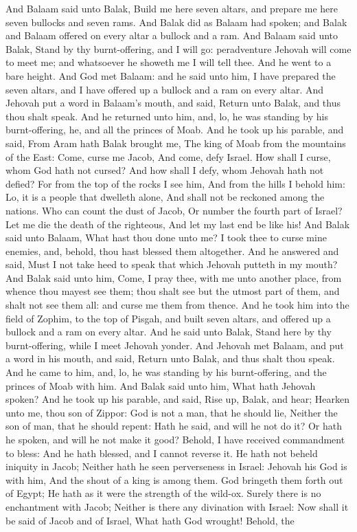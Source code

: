 And Balaam said unto Balak, Build me here seven altars, and prepare me here seven bullocks and seven rams. And Balak did as Balaam had spoken; and Balak and Balaam offered on every altar a bullock and a ram. And Balaam said unto Balak, Stand by thy burnt-offering, and I will go: peradventure Jehovah will come to meet me; and whatsoever he showeth me I will tell thee. And he went to a bare height. And God met Balaam: and he said unto him, I have prepared the seven altars, and I have offered up a bullock and a ram on every altar. And Jehovah put a word in Balaam’s mouth, and said, Return unto Balak, and thus thou shalt speak. And he returned unto him, and, lo, he was standing by his burnt-offering, he, and all the princes of Moab. And he took up his parable, and said, From Aram hath Balak brought me, The king of Moab from the mountains of the East: Come, curse me Jacob, And come, defy Israel.  How shall I curse, whom God hath not cursed? And how shall I defy, whom Jehovah hath not defied?  For from the top of the rocks I see him, And from the hills I behold him: Lo, it is a people that dwelleth alone, And shall not be reckoned among the nations.  Who can count the dust of Jacob, Or number the fourth part of Israel? Let me die the death of the righteous, And let my last end be like his!  And Balak said unto Balaam, What hast thou done unto me? I took thee to curse mine enemies, and, behold, thou hast blessed them altogether. And he answered and said, Must I not take heed to speak that which Jehovah putteth in my mouth?  And Balak said unto him, Come, I pray thee, with me unto another place, from whence thou mayest see them; thou shalt see but the utmost part of them, and shalt not see them all: and curse me them from thence. And he took him into the field of Zophim, to the top of Pisgah, and built seven altars, and offered up a bullock and a ram on every altar. And he said unto Balak, Stand here by thy burnt-offering, while I meet Jehovah yonder. And Jehovah met Balaam, and put a word in his mouth, and said, Return unto Balak, and thus shalt thou speak. And he came to him, and, lo, he was standing by his burnt-offering, and the princes of Moab with him. And Balak said unto him, What hath Jehovah spoken? And he took up his parable, and said, Rise up, Balak, and hear; Hearken unto me, thou son of Zippor:  God is not a man, that he should lie, Neither the son of man, that he should repent: Hath he said, and will he not do it? Or hath he spoken, and will he not make it good?  Behold, I have received commandment to bless: And he hath blessed, and I cannot reverse it.  He hath not beheld iniquity in Jacob; Neither hath he seen perverseness in Israel: Jehovah his God is with him, And the shout of a king is among them.  God bringeth them forth out of Egypt; He hath as it were the strength of the wild-ox.  Surely there is no enchantment with Jacob; Neither is there any divination with Israel: Now shall it be said of Jacob and of Israel, What hath God wrought!  Behold, the 